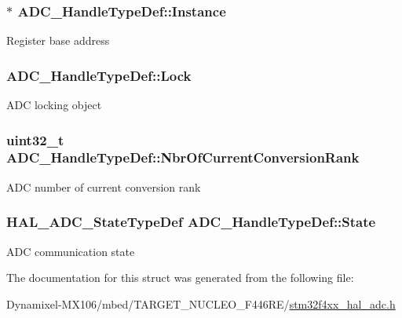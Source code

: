 \subsubsection[{\texorpdfstring{Instance}{Instance}}]{$\ast$ A\+D\+C\+\_\+\+Handle\+Type\+Def\+::\+Instance}\hypertarget{struct_a_d_c___handle_type_def_a3d89e51782aec71f9cfdff63f943d785}{}\label{struct_a_d_c___handle_type_def_a3d89e51782aec71f9cfdff63f943d785}
Register base address 
\subsubsection[{\texorpdfstring{Lock}{Lock}}]{ A\+D\+C\+\_\+\+Handle\+Type\+Def\+::\+Lock}\hypertarget{struct_a_d_c___handle_type_def_a7ef248e63b28b67cd985bafaeffd68ba}{}\label{struct_a_d_c___handle_type_def_a7ef248e63b28b67cd985bafaeffd68ba}
A\+DC locking object 
\subsubsection[{\texorpdfstring{Nbr\+Of\+Current\+Conversion\+Rank}{NbrOfCurrentConversionRank}}]{ uint32\+\_\+t A\+D\+C\+\_\+\+Handle\+Type\+Def\+::\+Nbr\+Of\+Current\+Conversion\+Rank}\hypertarget{struct_a_d_c___handle_type_def_a434bd009117470aa394a3043fa759dc8}{}\label{struct_a_d_c___handle_type_def_a434bd009117470aa394a3043fa759dc8}
A\+DC number of current conversion rank 
\subsubsection[{\texorpdfstring{State}{State}}]{ {\bf H\+A\+L\+\_\+\+A\+D\+C\+\_\+\+State\+Type\+Def} A\+D\+C\+\_\+\+Handle\+Type\+Def\+::\+State}\hypertarget{struct_a_d_c___handle_type_def_a8efe107a09ecb028a8bc69192d99b84f}{}\label{struct_a_d_c___handle_type_def_a8efe107a09ecb028a8bc69192d99b84f}
A\+DC communication state 

The documentation for this struct was generated from the following file\+:\begin{DoxyCompactItemize}
\item 
Dynamixel-\/\+M\+X106/mbed/\+T\+A\+R\+G\+E\+T\+\_\+\+N\+U\+C\+L\+E\+O\+\_\+\+F446\+R\+E/\hyperlink{stm32f4xx__hal__adc_8h}{stm32f4xx\+\_\+hal\+\_\+adc.\+h}\end{DoxyCompactItemize}
